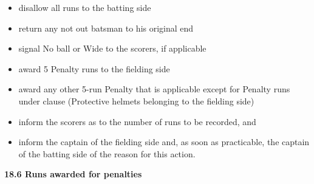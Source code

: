 \documentclass[12pt]{article}
\begin{document}
\vspace{\baselineskip}
\begin{itemize}
	\item {\fontsize{9pt}{10.8pt}\selectfont disallow all runs to the batting side\par}\par


\vspace{\baselineskip}
	\item {\fontsize{9pt}{10.8pt}\selectfont return any not out batsman to his original end\par}\par


\vspace{\baselineskip}
	\item {\fontsize{9pt}{10.8pt}\selectfont signal No ball or Wide to the scorers, if applicable\par}\par


\vspace{\baselineskip}
	\item {\fontsize{9pt}{10.8pt}\selectfont award 5 Penalty runs to the fielding side\par}\par


\vspace{\baselineskip}
	\item {\fontsize{9pt}{10.8pt}\selectfont award any other 5-run Penalty that is applicable except for Penalty runs under clause (Protective helmets belonging to the fielding side)\par}\par


\vspace{\baselineskip}
	\item {\fontsize{9pt}{10.8pt}\selectfont inform the scorers as to the number of runs to be recorded, and\par}\par


\vspace{\baselineskip}
	\item {\fontsize{9pt}{10.8pt}\selectfont inform the captain of the fielding side and, as soon as practicable, the captain of the batting side of the reason for this action.\par}
\end{itemize}\par


\vspace{\baselineskip}
{\fontsize{11pt}{13.2pt}\selectfont \textbf{18.6 \tabto{0.47in} Runs awarded for penalties}\par}\par
\end{document}

